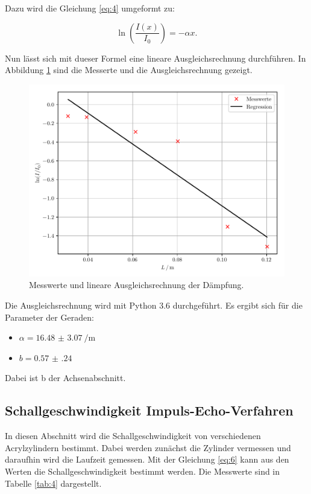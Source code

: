 Dazu wird die Gleichung \ref{eq:4} umgeformt zu:

\begin{equation*}
 \ln(\frac{I(x)}{I_0}) = - \alpha x.
\end{equation*}

Nun lässt sich mit dueser Formel eine lineare Ausgleichsrechnung durchführen.
In Abbildung \ref{abb:2} sind die Messerte und die Ausgleichsrechnung gezeigt.

\begin{figure}[H]
  \centering
  \includegraphics{plot1.pdf}
  \caption{Messwerte und lineare Ausgleichsrechnung der Dämpfung.}
  \label{abb:2}
\end{figure}

Die Ausgleichsrechnung wird mit Python 3.6 durchgeführt. Es ergibt sich für die Parameter
der Geraden:

\begin{itemize}
  \item $\alpha = \SI{16.48(307)}{\per\meter}$
  \item $b = \num{0.57(24)}$
\end{itemize}

Dabei ist b der Achsenabschnitt.

\subsection{Schallgeschwindigkeit Impuls-Echo-Verfahren}

In diesen Abschnitt wird die Schallgeschwindigkeit von verschiedenen Acrylzylindern
bestimmt. Dabei werden zunächst die Zylinder vermessen und daraufhin wird die Laufzeit
gemessen. Mit der Gleichung \ref{eq:6} kann aus den Werten die Schallgeschwindigkeit
bestimmt werden. Die Messwerte sind in Tabelle \ref{tab:4} dargestellt.

